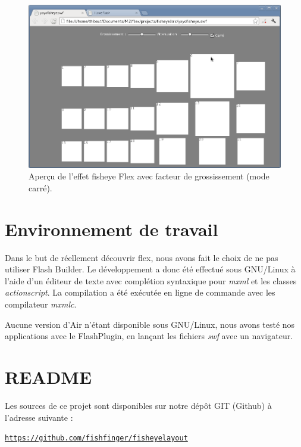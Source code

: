 \begin{minipage}[H]{.5\textwidth}
\begin{figure}[H]
  \centering
  \includegraphics[width=\textwidth]{../resources/illustrations/flex_screen_3}
  \caption{Aperçu de l'effet fisheye Flex avec facteur de grossissement (mode carré).}
  \label{fig:js_6}
\end{figure}
\end{minipage}

\section{Environnement de travail}

Dans le but de réellement découvrir flex, nous avons fait le choix de ne pas utiliser Flash Builder. Le développement a donc été effectué sous GNU/Linux à l'aide d'un éditeur de texte avec complétion syntaxique pour \emph{mxml} et les classes \emph{actionscript}. La compilation a été exécutée en ligne de commande avec les compilateur \emph{mxmlc}.

Aucune version d'Air n'étant disponible sous GNU/Linux, nous avons testé nos applications avec le FlashPlugin, en lançant les fichiers \emph{swf} avec un navigateur.

\section{README}

Les sources de ce projet sont disponibles sur notre dépôt GIT (Github) à l'adresse suivante :
\begin{center}
  \href{https://github.com/fishfinger/fisheyelayout}{\texttt{https://github.com/fishfinger/fisheyelayout}}
\end{center}

